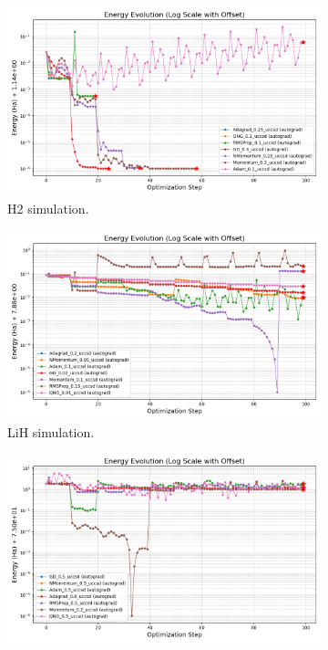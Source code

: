 \begin{figure}[H]
  \centering
  \begin{subfigure}{0.32\textwidth}
    \includegraphics[width=\textwidth]{data/Optimizadores/final_results_H2/energy_evolution_log_offset.png}
    \caption{H2 simulation.}
    \label{fig:subimage1}
  \end{subfigure}
  \begin{subfigure}{0.32\textwidth}
    \includegraphics[width=\textwidth]{data/Optimizadores/final_results_LiH/energy_evolution_log_offset.png}
    \caption{LiH simulation.}
    \label{fig:subimage2}
  \end{subfigure}
  \begin{subfigure}{0.32\textwidth}
    \includegraphics[width=\textwidth]{data/Optimizadores/final_results_H20/energy_evolution_log_offset.png}

\end{subfigure}
\end{figure}

